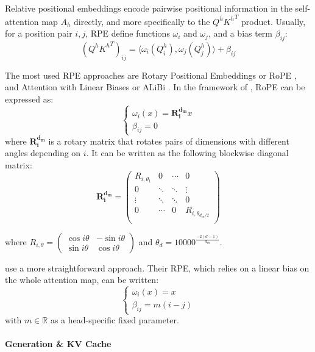 Relative positional embeddings encode pairwise positional information in the self-attention map $A_h$ directly, and more specifically to the $Q^h {K^h}^T$ product. Usually, for a position pair $i, j$, RPE define functions $\omega_i$ and $\omega_j$, and a bias term $\beta_{ij}$:
\begin{equation}
    \label{eq:rpe}
(Q^h {K^h}^T)_{ij} = \langle \omega_i(Q^h_i), \omega_j(Q^h_j) \rangle + \beta_{ij}
\end{equation}

The most used RPE approaches are Rotary Positional Embeddings or RoPE \citep{rope}, and Attention with Linear Biases or ALiBi \citep{alibi}. In the framework of , RoPE can be expressed as:
$$
\begin{cases}
    \omega_i(x) = \mathbf{R^{d_m}_i}x \\
    \beta_{ij} = 0
\end{cases}
$$
where $\mathbf{R^{d_m}_i}$ is a rotary matrix that rotates pairs of dimensions with different angles depending on $i$. It can be written as the following blockwise diagonal matrix:
$$
\mathbf{R^{d_m}_i} = \begin{pmatrix}
    R_{i, \theta_1} & 0 & \cdots & 0 \\
    0 & \ddots & \ddots & \vdots \\
    \vdots & \ddots & \ddots & 0 \\
    0 & \cdots & 0 &  R_{i, \theta_{d_m/2}} \\
\end{pmatrix}
$$

where $R_{i, \theta} = \begin{pmatrix}
    \cos i \theta & -\sin i \theta \\
    \sin i \theta & \cos i \theta
\end{pmatrix}$ and $\theta_d = 10000^{\frac{-2(d-1)}{d_m}}$.

\citet{alibi} use a more straightforward approach. Their RPE, which relies on a linear bias on the whole attention map, can be written:
$$
\begin{cases}
    \omega_i(x) = x \\
    \beta_{ij} = m (i-j)
\end{cases}
$$
with $m \in \mathbb{R}$ as a head-specific fixed parameter.

\paragraph{Generation \& KV Cache}

